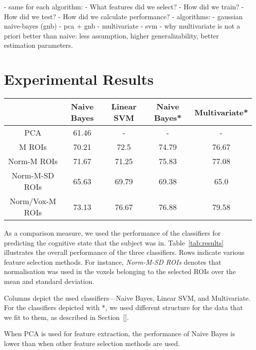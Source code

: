 \documentclass[preprint,journal,11pt]{vgtc}
\begin{document}
- same for each algorithm:
    - What features did we select?
    - How did we train?
    - How did we test?
        - How did we calculate performance?
- algorithms:
    - gaussian naive-bayes (gnb)
        - pca + gnb
    - multivariate
    - svm
    - why multivariate is not a priori better than naive: less assumption, higher generalizability, better estimation parameters. 



\section{Experimental Results}
\label{sec:results}

\begin{table*}[htpb]
\centering
{\small
\begin{tabular}{c|c|c|c|c}
& \textbf{Naive Bayes} & \textbf{Linear SVM} & \textbf{Naive Bayes*} & \textbf{Multivariate*} \\ \hline
PCA & 61.46 &  - & - & - \\
M ROIs & 70.21 & 72.5 & 74.79 & 76.67 \\
Norm-M ROIs & 71.67 & 71.25 & 75.83 & 77.08 \\
Norm-M-SD ROIs & 65.63 & 69.79 & 69.38 & 65.0 \\
Norm/Vox-M ROIs & 73.13 & 76.67 & 76.88 & 79.58 \\
\end{tabular}}
\caption{Performance results (in \%) of the three classifiers on different methods for feature selection and structure. \emph{M} stands for \emph{Mean}, \emph{Norm} for \emph{Normalisation}, and \emph{SD} for \emph{Standard Deviation}}
\label{tab:results}
\end{table*}

As a comparison measure, we used the performance of the classifiers for predicting the cognitive state that the subject was in. Table~\ref{tab:results} illustrates the overall performance of the three classifiers. Rows indicate various feature selection methods. For instance, \emph{Norm-M-SD ROIs} denotes that normalisation was used in the voxels belonging to the selected ROIs over the mean and standard deviation.



Columns depict the used classifiers---Naive Bayes, Linear SVM, and Multivariate. For the classifiers depicted with *, we used different structure for the data that we fit to them, as described in Section~\ref{}.

When PCA is used for feature extraction, the performance of Naive Bayes is lower than when other feature selection methods are used. 
\end{document}
